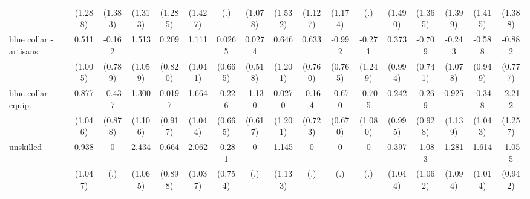 {\begin{tabular}{l*{16}{c}}
                    &     (1.288)         &     (1.383)         &     (1.313)         &     (1.285)         &     (1.427)         &         (.)         &     (1.078)         &     (1.532)         &     (1.127)         &     (1.174)         &         (.)         &     (1.490)         &     (1.365)         &     (1.399)         &     (1.415)         &     (1.388)         \\
[1em]
blue collar - artisans&       0.511         &      -0.162         &       1.513         &       0.209         &       1.111         &      0.0265         &      0.0274         &       0.646         &       0.633         &      -0.992         &      -0.271         &       0.373         &      -0.709         &      -0.243         &      -0.588         &      -0.882         \\
                    &     (1.005)         &     (0.789)         &     (1.059)         &     (0.820)         &     (1.041)         &     (0.665)         &     (0.518)         &     (1.201)         &     (0.760)         &     (0.765)         &     (1.249)         &     (0.994)         &     (0.741)         &     (1.078)         &     (0.949)         &     (0.777)         \\
[1em]
blue collar - equip.&       0.877         &      -0.437         &       1.300         &      0.0197         &       1.664         &      -0.226         &      -1.130         &      0.0270         &      -0.164         &      -0.670         &      -0.705         &       0.242         &      -0.269         &       0.925         &      -0.348         &      -2.212         \\
                    &     (1.046)         &     (0.878)         &     (1.106)         &     (0.917)         &     (1.044)         &     (0.665)         &     (0.617)         &     (1.201)         &     (0.723)         &     (0.670)         &     (1.080)         &     (0.995)         &     (0.928)         &     (1.139)         &     (1.043)         &     (1.257)         \\
[1em]
unskilled           &       0.938         &           0         &       2.434\sym{*}  &       0.664         &       2.062\sym{*}  &      -0.281         &           0         &       1.145         &           0         &           0         &           0         &       0.397         &      -1.083         &       1.281         &       1.614         &      -1.055         \\
                    &     (1.047)         &         (.)         &     (1.065)         &     (0.898)         &     (1.037)         &     (0.754)         &         (.)         &     (1.133)         &         (.)         &         (.)         &         (.)         &     (1.044)         &     (1.062)         &     (1.094)         &     (1.014)         &     (0.942)         \\

\end{tabular}}
